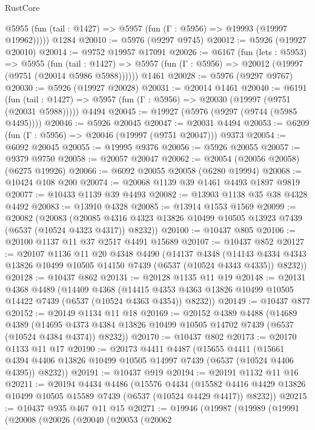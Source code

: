 \begin{lexlean}{RustCore}
\begin{coremodule}
      @5955 (fun (tail : @1427) => @5957 (fun (Γ : @5956) => @19993 (@19997 @19962)))))
    @1284
@20010 := @5976 (@9297 @9745)
@20012 := @5926 (@19927 @20010)
@20014 := @9752 @19957 @17091
@20026 := @6167
    (fun (lets : @5953) =>
    @5955
      (fun (tail : @1427) =>
      @5957 (fun (Γ : @5956) => @20012 (@19997 (@9751 (@20014 @5986 @5988))))))
    @1461
@20028 := @5976 (@9297 @9767)
@20030 := @5926 (@19927 @20028)
@20031 := @20014 @1461
@20040 := @6191
    (fun (tail : @1427) => @5957 (fun (Γ : @5956) => @20030 (@19997 (@9751 (@20031 @5988)))))
    @4494
@20045 := @19927 (@5976 (@9297 (@9744 (@5985 @4495))))
@20046 := @5926 @20045
@20047 := @20031 @4494
@20053 := @6209 (fun (Γ : @5956) => @20046 (@19997 (@9751 @20047))) @9373
@20054 := @6092 @20045
@20055 := @19995 @9376
@20056 := @5926 @20055
@20057 := @9379 @9750
@20058 := @20057 @20047
@20062 := @20054 (@20056 @20058) (@6275 @19926)
@20066 := @6092 @20055 @20058 (@6280 @19994)
@20068 := @10424 @108 @200
@20074 := @20068 @1139 @39 @1461 @4493 @1897 @9819
@20077 := @10433 @1139 @39 @4493
@20082 := @13903 @1138 @35 @38 @4328 @4492
@20083 := @13910 @4328
@20085 := @13914 @1553 @1569
@20099 := @20082
    (@20083
      (@20085 @4316 @4323 @13826 @10499 @10505 @13923 @7439 (@6537 (@10524 @4323 @4317)) @8232))
@20100 := @10437 @805
@20106 := @20100 @1137 @11 @37 @2517 @4491 @15689
@20107 := @10437 @852
@20127 := @20107
    @1136
    @11
    @20
    @4348
    @4490
    (@14137
      @4348
      (@14143 @4334 @4343 @13826 @10499 @10505 @14150 @7439 (@6537 (@10524 @4343 @4335)) @8232))
@20128 := @10437 @862
@20131 := @20128 @1135 @11 @19
@20148 := @20131
    @4368
    @4489
    (@14409
      @4368
      (@14415 @4353 @4363 @13826 @10499 @10505 @14422 @7439 (@6537 (@10524 @4363 @4354)) @8232))
@20149 := @10437 @877
@20152 := @20149 @1134 @11 @18
@20169 := @20152
    @4389
    @4488
    (@14689
      @4389
      (@14695 @4373 @4384 @13826 @10499 @10505 @14702 @7439 (@6537 (@10524 @4384 @4374)) @8232))
@20170 := @10437 @802
@20173 := @20170 @1133 @11 @17
@20190 := @20173
    @4411
    @4487
    (@15655
      @4411
      (@15661 @4394 @4406 @13826 @10499 @10505 @14997 @7439 (@6537 (@10524 @4406 @4395)) @8232))
@20191 := @10437 @919
@20194 := @20191 @1132 @11 @16
@20211 := @20194
    @4434
    @4486
    (@15576
      @4434
      (@15582 @4416 @4429 @13826 @10499 @10505 @15589 @7439 (@6537 (@10524 @4429 @4417)) @8232))
@20215 := @10437 @935 @467 @11 @15
@20271 := @19946
    (@19987
      (@19989
        (@19991
          (@20008
            (@20026
              (@20040
                (@20053
                  (@20062

\end{coremodule}
\end{lexlean}
